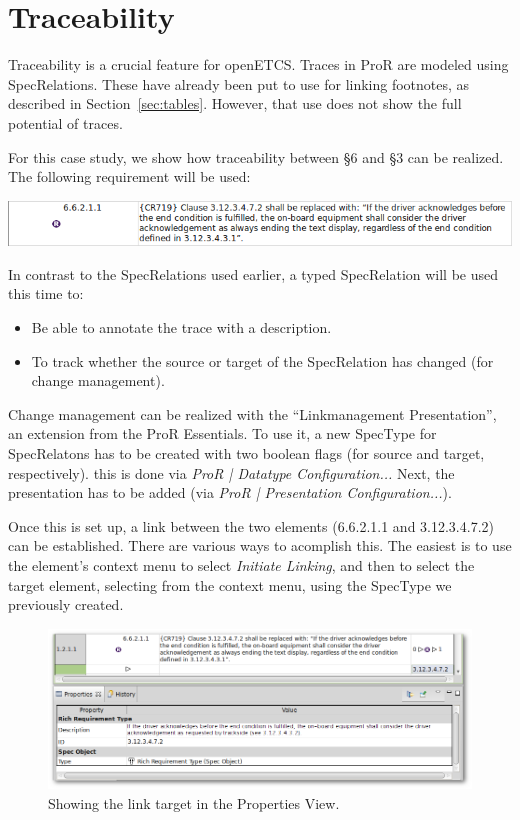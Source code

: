 \documentclass{template/openetcs_report}
\begin{document}
\section{Traceability}

Traceability is a crucial feature for openETCS.  Traces in ProR are modeled using SpecRelations.  These have already been put to use for linking footnotes, as described in Section~\ref{sec:tables}.  However, that use does not show the full potential of traces.

For this case study, we show how traceability between §6 and §3 can be realized.  The following requirement will be used:

\includegraphics[width=\textwidth]{img/R-66211.png}

In contrast to the SpecRelations used earlier, a typed SpecRelation will be used this time to:

\begin{itemize}
\item Be able to annotate the trace with a description.
\item To track whether the source or target of the SpecRelation has changed (for change management).
\end{itemize}

Change management can be realized with the ``Linkmanagement Presentation'', an extension from the ProR Essentials.  To use it, a new SpecType for SpecRelatons has to be created with two boolean flags (for source and target, respectively).  this is done via \emph{ProR | Datatype Configuration...}  Next, the presentation has to be added (via \emph{ProR | Presentation Configuration...}).

Once this is set up, a link between the two elements (6.6.2.1.1 and 3.12.3.4.7.2) can be established.  There are various ways to acomplish this.  The easiest is to use the element's context menu to select \emph{Initiate Linking}, and then to select the target element, selecting \emph{} from the context menu, using the SpecType we previously created.

\begin{figure}
	\begin{center}
	\includegraphics[width=\textwidth]{img/link-target-selected.png}
	\end{center}
	\caption{Showing the link target in the Properties View.}
	\label{fig:link-target-selected}
\end{figure}
\end{document}
